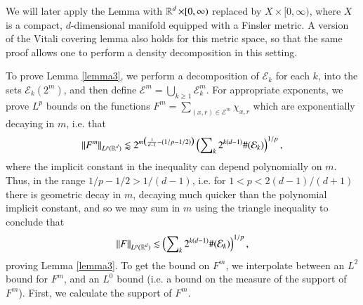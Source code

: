 \begin{remark}
  We will later apply the Lemma with $\operatorname{\mathbb{R}}^d \times [0,\infty)$ replaced by $X \times [0,\infty)$, where $X$ is a compact, $d$-dimensional manifold equipped with a Finsler metric. A version of the Vitali covering lemma also holds for this metric space, so that the same proof allows one to perform a density decomposition in this setting.
\end{remark}

To prove Lemma \ref{lemma3}, we perform a decomposition of $\mathcal{E}_k$ for each $k$, into the sets $\mathcal{E}_k(2^m)$, and then define $\mathcal{E}^m = \bigcup_{k \geq 1} \mathcal{E}_k^m$. For appropriate exponents, we prove $L^p$ bounds on the functions $F^m = \sum\nolimits_{(x,r) \in \mathcal{E}^m} \chi_{x,r}$ which are exponentially decaying in $m$, i.e. that
%
\begin{equation}
  \| F^m \|_{L^p(\operatorname{\mathbb{R}}^d)} \lessapprox 2^{m \big( \frac{1}{d-1} - (1/p - 1/2) \big)} \left( \sum\nolimits_k 2^{k(d-1)} \#(\mathcal{E}_k) \right)^{1/p},
\end{equation}
where the implicit constant in the inequality can depend polynomially on $m$. Thus, in the range $1/p - 1/2 > 1/(d-1)$, i.e. for $1 < p < 2(d-1)/(d+1)$ there is geometric decay in $m$, decaying much quicker than the polynomial implicit constant, and so we may sum in $m$ using the triangle inequality to conclude that
%
\begin{equation}
  \| F \|_{L^p(\operatorname{\mathbb{R}}^d)} \lesssim \left( \sum\nolimits_k 2^{k(d-1)} \#(\mathcal{E}_k) \right)^{1/p},
\end{equation}
%
proving Lemma \ref{lemma3}. To get the bound on $F^m$, we interpolate between an $L^2$ bound for $F^m$, and an $L^0$ bound (i.e. a bound on the measure of the support of $F^m$). First, we calculate the support of $F^m$.

